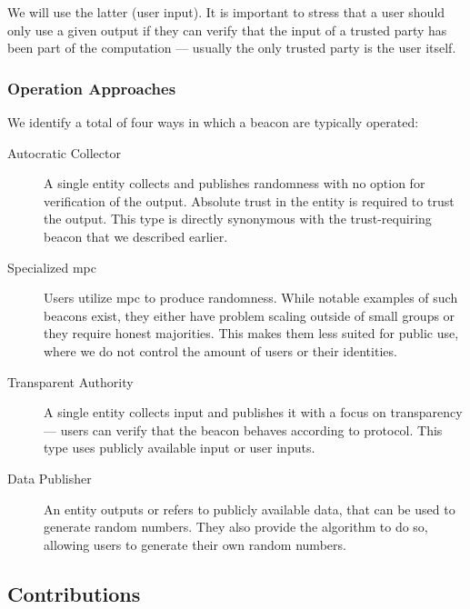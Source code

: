 We will use the latter (user input).
It is important to stress that a user should only use a given output if they can verify that the input of a trusted party has been part of the computation --- usually the only trusted party is the user itself.

\subsubsection{Operation Approaches}
We identify a total of four ways in which a beacon are typically operated:

\begin{description}
    \item [Autocratic Collector] A single entity collects and publishes randomness with no option for verification of the output. Absolute trust in the entity is required to trust the output. This type is directly synonymous with the trust-requiring beacon that we described earlier.

    \item [Specialized \acrshort{mpc}] Users utilize \acrfull{mpc} to produce randomness. While notable examples of such beacons exist, they either have problem scaling outside of small groups or they require honest majorities. This makes them less suited for public use, where we do not control the amount of users or their identities.

    \item [Transparent Authority] A single entity collects input and publishes it with a focus on transparency --- users can verify that the beacon behaves according to protocol. This type uses publicly available input or user inputs.

    \item [Data Publisher] An entity outputs or refers to publicly available data, that can be used to generate random numbers. They also provide the algorithm to do so, allowing users to generate their own random numbers.
\end{description}

\subsection{Contributions}
